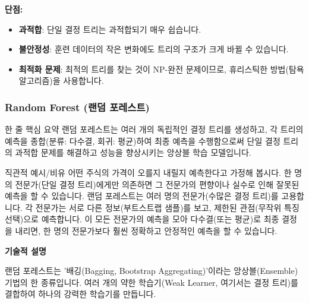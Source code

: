 \documentclass[11pt,a4paper]{article}
\begin{document}
\textbf{단점:}
\begin{itemize}
    \item \textbf{과적합}: 단일 결정 트리는 과적합되기 매우 쉽습니다.
    \item \textbf{불안정성}: 훈련 데이터의 작은 변화에도 트리의 구조가 크게 바뀔 수 있습니다.
    \item \textbf{최적화 문제}: 최적의 트리를 찾는 것이 NP-완전 문제이므로, 휴리스틱한 방법(탐욕 알고리즘)을 사용합니다.
\end{itemize}

\subsubsection{Random Forest (랜덤 포레스트)}

\begin{summarybox}{한 줄 핵심 요약}
랜덤 포레스트는 여러 개의 독립적인 결정 트리를 생성하고, 각 트리의 예측을 종합(분류: 다수결, 회귀: 평균)하여 최종 예측을 수행함으로써 단일 결정 트리의 과적합 문제를 해결하고 성능을 향상시키는 앙상블 학습 모델입니다.
\end{summarybox}

\begin{examplebox}{직관적 예시/비유}
어떤 주식의 가격이 오를지 내릴지 예측한다고 가정해 봅시다. 한 명의 전문가(단일 결정 트리)에게만 의존하면 그 전문가의 편향이나 실수로 인해 잘못된 예측을 할 수 있습니다. 랜덤 포레스트는 여러 명의 전문가(수많은 결정 트리)를 고용합니다. 각 전문가는 서로 다른 정보(부트스트랩 샘플)를 보고, 제한된 관점(무작위 특징 선택)으로 예측합니다. 이 모든 전문가의 예측을 모아 다수결(또는 평균)로 최종 결정을 내리면, 한 명의 전문가보다 훨씬 정확하고 안정적인 예측을 할 수 있습니다.
\end{examplebox}

\textbf{기술적 설명}

랜덤 포레스트는 '배깅(Bagging, Bootstrap Aggregating)'이라는 앙상블(Ensemble) 기법의 한 종류입니다. 여러 개의 약한 학습기(Weak Learner, 여기서는 결정 트리)를 결합하여 하나의 강력한 학습기를 만듭니다.
\end{document}
